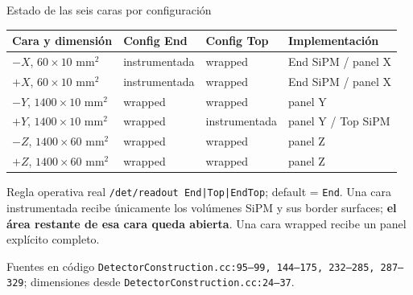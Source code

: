 \documentclass[aspectratio=169]{beamer}
\begin{document}
\begin{frame}{Estado de las seis caras por configuración}
  \scriptsize
  \begin{tabular}{llll}
    \toprule
    Cara y dimensión & Config End & Config Top & Implementación\\
    \midrule
    $-X$, $60\times10$ mm$^2$ & instrumentada & wrapped & End SiPM / panel X\\
    $+X$, $60\times10$ mm$^2$ & instrumentada & wrapped & End SiPM / panel X\\
    $-Y$, $1400\times10$ mm$^2$ & wrapped & wrapped & panel Y\\
    $+Y$, $1400\times10$ mm$^2$ & wrapped & instrumentada & panel Y / Top SiPM\\
    $-Z$, $1400\times60$ mm$^2$ & wrapped & wrapped & panel Z\\
    $+Z$, $1400\times60$ mm$^2$ & wrapped & wrapped & panel Z\\
    \bottomrule
  \end{tabular}
  \vspace{0.35cm}
  \begin{block}{Regla operativa real}
    \texttt{/det/readout End|Top|EndTop}; default = \texttt{End}. Una cara
    instrumentada recibe únicamente los volúmenes SiPM y sus border surfaces;
    \textbf{el área restante de esa cara queda abierta}. Una cara wrapped
    recibe un panel explícito completo.
  \end{block}
  \begin{alertblock}{Fuentes en código}
    \texttt{DetectorConstruction.cc:95--99, 144--175, 232--285, 287--329};
    dimensiones desde \texttt{DetectorConstruction.cc:24--37}.
  \end{alertblock}
\end{frame}
\end{document}
